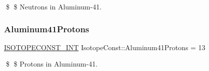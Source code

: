 \$ \$ Neutrons in Aluminum-\/41. \mbox{\label{group___isotope_const-_aluminum-_al41_gae8ed09d432dc0bbf75c223cebedbd19c}} 
\subsubsection{\texorpdfstring{Aluminum41\+Protons}{Aluminum41Protons}}
{\footnotesize\ttfamily \mbox{\hyperlink{group___isotope_const-_macros_ga5f18360b3e99483a35c32d789e62621c}{I\+S\+O\+T\+O\+P\+E\+C\+O\+N\+S\+T\+\_\+\+I\+NT}} Isotope\+Const\+::\+Aluminum41\+Protons = 13}

\$ \$ Protons in Aluminum-\/41. 
